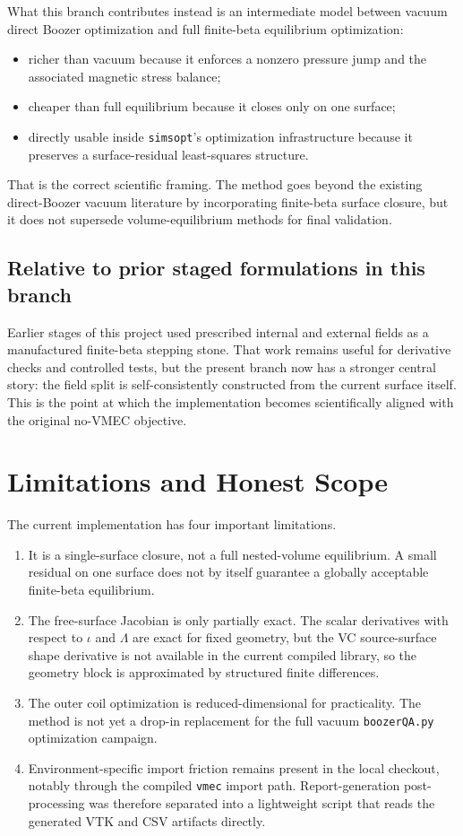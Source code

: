 \documentclass[11pt]{article}
\begin{document}
What this branch contributes instead is an intermediate model between vacuum direct Boozer optimization and full finite-beta equilibrium optimization:

\begin{itemize}
\item richer than vacuum because it enforces a nonzero pressure jump and the associated magnetic stress balance;
\item cheaper than full equilibrium because it closes only on one surface;
\item directly usable inside \texttt{simsopt}'s optimization infrastructure because it preserves a surface-residual least-squares structure.
\end{itemize}

That is the correct scientific framing. The method goes beyond the existing direct-Boozer vacuum literature by incorporating finite-beta surface closure, but it does not supersede volume-equilibrium methods for final validation.

\subsection{Relative to prior staged formulations in this branch}
Earlier stages of this project used prescribed internal and external fields as a manufactured finite-beta stepping stone. That work remains useful for derivative checks and controlled tests, but the present branch now has a stronger central story: the field split is self-consistently constructed from the current surface itself. This is the point at which the implementation becomes scientifically aligned with the original no-VMEC objective.

\section{Limitations and Honest Scope}
The current implementation has four important limitations.

\begin{enumerate}
\item It is a single-surface closure, not a full nested-volume equilibrium. A small residual on one surface does not by itself guarantee a globally acceptable finite-beta equilibrium.
\item The free-surface Jacobian is only partially exact. The scalar derivatives with respect to $\iota$ and $\Lambda$ are exact for fixed geometry, but the VC source-surface shape derivative is not available in the current compiled library, so the geometry block is approximated by structured finite differences.
\item The outer coil optimization is reduced-dimensional for practicality. The method is not yet a drop-in replacement for the full vacuum \texttt{boozerQA.py} optimization campaign.
\item Environment-specific import friction remains present in the local checkout, notably through the compiled \texttt{vmec} import path. Report-generation post-processing was therefore separated into a lightweight script that reads the generated VTK and CSV artifacts directly.
\end{enumerate}
\end{document}
